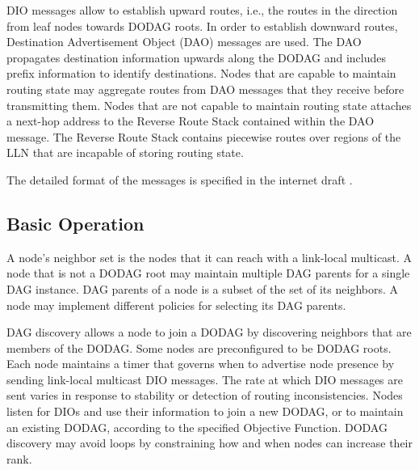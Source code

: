 DIO messages allow to establish upward routes, i.e., the routes in the direction from leaf nodes towards DODAG roots.  In order to establish downward routes, Destination Advertisement Object (DAO) messages are used. The DAO propagates destination information upwards along the DODAG and includes prefix information to identify destinations. Nodes that are capable to maintain routing state may aggregate routes from DAO messages that they receive before transmitting them. Nodes that are not capable to maintain routing state attaches a next-hop address to the Reverse Route Stack contained within the DAO message. The Reverse Route Stack contains piecewise routes over regions of the LLN that are incapable of storing routing state.

The detailed format of the messages is specified in the internet draft \cite{draft-rpl-04}.

\subsection{Basic Operation}
A node's neighbor set is the nodes that it can reach with a link-local multicast. A node that is not a DODAG root may maintain multiple DAG parents for a single DAG instance. DAG parents of a node is a subset of the set of       its neighbors. A node may implement different policies for selecting its DAG parents. 

DAG discovery allows a node to join a DODAG by discovering neighbors that are members of the DODAG.  Some nodes are preconfigured to be DODAG roots. Each node maintains a timer that governs when to advertise node presence by sending link-local multicast DIO messages. The rate at which DIO messages are sent varies in response to stability or detection of routing inconsistencies. Nodes listen for DIOs and use their information to join a new DODAG, or to maintain an existing DODAG, according to the specified Objective Function. DODAG discovery may avoid loops by constraining how and when nodes can increase their rank.






